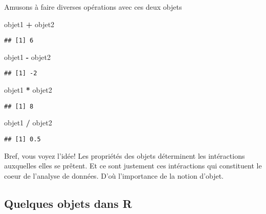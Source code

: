 \documentclass[]{book}
\newenvironment{Shaded}{\begin{snugshade}}{\end{snugshade}}
\newcommand{\StringTok}[1]{\textcolor[rgb]{0.31,0.60,0.02}{#1}}
\newcommand{\OperatorTok}[1]{\textcolor[rgb]{0.81,0.36,0.00}{\textbf{#1}}}
\newcommand{\NormalTok}[1]{#1}
\begin{document}
Amusons à faire diverses opérations avec ces deux objets

\begin{Shaded}
\begin{Highlighting}[]
\NormalTok{objet1 }\OperatorTok{+}\StringTok{ }\NormalTok{objet2}
\end{Highlighting}
\end{Shaded}

\begin{verbatim}
## [1] 6
\end{verbatim}

\begin{Shaded}
\begin{Highlighting}[]
\NormalTok{objet1 }\OperatorTok{-}\StringTok{ }\NormalTok{objet2}
\end{Highlighting}
\end{Shaded}

\begin{verbatim}
## [1] -2
\end{verbatim}

\begin{Shaded}
\begin{Highlighting}[]
\NormalTok{objet1 }\OperatorTok{*}\StringTok{ }\NormalTok{objet2}
\end{Highlighting}
\end{Shaded}

\begin{verbatim}
## [1] 8
\end{verbatim}

\begin{Shaded}
\begin{Highlighting}[]
\NormalTok{objet1 }\OperatorTok{/}\StringTok{ }\NormalTok{objet2}
\end{Highlighting}
\end{Shaded}

\begin{verbatim}
## [1] 0.5
\end{verbatim}

Bref, vous voyez l'idée! Les propriétés des objets déterminent les
intéractions auxquelles elles se prêtent. Et ce sont justement ces
intéractions qui constituent le coeur de l'analyse de données. D'où
l'importance de la notion d'objet.

\subsection{Quelques objets dans R}\label{quelques-objets-dans-r}
\end{document}
